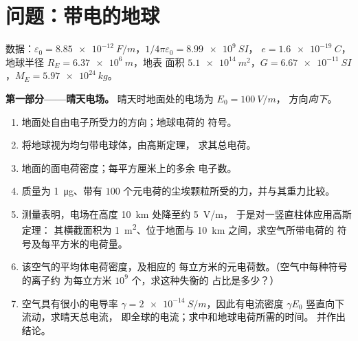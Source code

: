 \section{问题：带电的地球}

\begin{problem}
\label{pb:b1:electrostatics-gauss:1}
数据：$\varepsilon_0 = \qty{8.85e-12}{F/m}$，$1/4\pi\varepsilon_0 = \qty{8.99e9}{SI}$，
$e = \qty{1.6e-19}{C}$，地球半径 $R_E = \qty{6.37e6}{m}$，地表
面积 $\qty{5.1e14}{m^2}$，$G = \qty{6.67e-11}{SI}$，$M_E = \qty{5.97e24}{kg}$。

\medskip
\noindent\textbf{第一部分——晴天电场。}
晴天时地面处的电场为 $E_0 = \qty{100}{V/m}$，
方向\emph{向下}。
\begin{enumerate}
  \item 地面处自由电子所受力的方向；地球电荷的
        符号。
  \item 将地球视为均匀带电球体，由高斯定理，
        求其总电荷。
  \item 地面的面电荷密度；每平方厘米上的多余
        电子数。
  \item 质量为 \qty{1}{\micro g}、带有 $100$
        个元电荷的尘埃颗粒所受的力，并与其重力比较。
  \item 测量表明，电场在高度 \qty{10}{km} 处降至约 \qty{5}{V/m}，
        于是对一竖直柱体应用高斯定理：
        其横截面积为 \qty{1}{m^2}、位于地面与 \qty{10}{km} 之间，求空气所带电荷的
        符号及每平方米的电荷量。
  \item 该空气的平均体电荷密度，及相应的
        每立方米的元电荷数。（空气中每种符号的离子约
        为每立方米 $10^9$ 个，求这种失衡的
        占比是多少？）
  \item 空气具有很小的电导率 $\gamma = \qty{2e-14}{S/m}$，因此有电流密度
        $\gamma E_0$ 竖直向下流动，求晴天总电流，
        即全球的电流；求中和地球电荷所需的时间。
        并作出结论。
\end{enumerate}


\end{problem}
